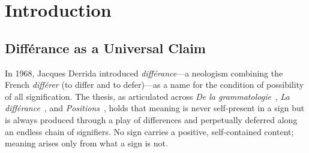 \documentclass[a4paper,twocolumn,11pt]{article}
\begin{document}
\begin{abstract}
\emph{Diff\'erance} is also internally self-undermining under its universal reading: self-referentially paradoxical, unfalsifiable, performatively contradictory in its mode of communication, and itself a metaphysical thesis---a metaphysics of deferral replacing the metaphysics of presence.

No prior work has tested \emph{diff\'erance} against operational systems. Existing critiques have been philosophical or hermeneutic. This paper presents the first constructive refutation grounded in reproducible engineering. Gunkel (2025) identified certain computational facts in large language models and assigned them a Derridean interpretation; even granting that interpretive move locally, the universal thesis does not follow, because the pipeline as a whole reaches bounded determinate closure rather than endless deferral.

The play of differences is real. Its universalization as endless, constitutive deferral of any determinate state is not.
\end{abstract}


\section{Introduction}
\label{sec:introduction}

\subsection{Diff\'erance as a Universal Claim}
\label{sec:universal}

In 1968, Jacques Derrida introduced \emph{diff\'erance}---a neologism combining the French \emph{diff\'erer} (to differ and to defer)---as a name for the condition of possibility of all signification. The thesis, as articulated across \emph{De la grammatologie}~\cite{Derrida1967,Derrida1976}, \emph{La diff\'erance}~\cite{Derrida1968,Derrida1982margins}, and \emph{Positions}~\cite{Derrida1972,Derrida1981}, holds that meaning is never self-present in a sign but is always produced through a play of differences and perpetually deferred along an endless chain of signifiers. No sign carries a positive, self-contained content; meaning arises only from what a sign is not.
\end{document}
